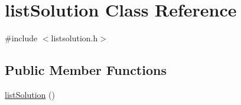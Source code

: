 \hypertarget{classlist_solution}{\section{list\-Solution Class Reference}
\label{classlist_solution}
}


{\ttfamily \#include $<$listsolution.\-h$>$}

\subsection*{Public Member Functions}
\begin{DoxyCompactItemize}
\item 
\hypertarget{classlist_solution_a9d3685567c422016200d957f5b316b8d}{\hyperlink{classlist_solution_a9d3685567c422016200d957f5b316b8d}{list\-Solution} ()}\label{classlist_solution_a9d3685567c422016200d957f5b316b8d}


\end{DoxyCompactItemize}
